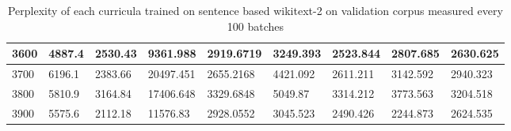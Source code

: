 \documentclass [11pt, proquest] {uwthesis}[2020/12/20]
\begin{document}
\begin{table}
\begin{tiny}
\begin{tabular}{|l|l|l|l|l|l|l|l|l|}
3600 & 4887.4 & 2530.43 & 9361.988 & 2919.6719 & 3249.393 & 2523.844 & 2807.685 & 2630.625 \\ \hline
3700 & 6196.1 & 2383.66 & 20497.451 & 2655.2168 & 4421.092 & 2611.211 & 3142.592 & 2940.323 \\ \hline
3800 & 5810.9 & 3164.84 & 17406.648 & 3329.6848 & 5049.87 & 3314.212 & 3773.563 & 3204.518 \\ \hline
3900 & 5575.6 & 2112.18 & 11576.83 & 2928.0552 & 3045.523 & 2490.426 & 2244.873 & 2624.535 \\ \hline
\end{tabular}
\caption{Perplexity of each curricula trained on sentence based wikitext-2 on validation corpus measured every 100 batches}
\label{tab:wikitext2-sentence-perplexity}
\end{tiny}
\end{table}
\end{document}
